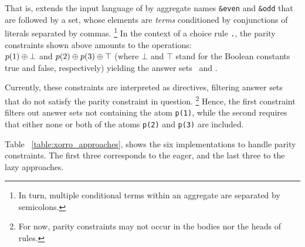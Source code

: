  
 That is, \xorro{} extends the input language of \clingo{} by
 aggregate names \texttt{\&even} and \texttt{\&odd} that are followed
 by a set, whose elements are \emph{terms} conditioned by
 conjunctions of literals separated by commas.%
 \footnote{In turn, multiple conditional terms within an aggregate are
 	separated by semicolons.}
 In the context of a choice rule \texttt{.}, the parity constraints shown above
 amounts to the \XOR{} operations: \\
 $p(1) \oplus \bot$ and $p(2) \oplus p(3) \oplus \top$
 (where $\bot$ and $\top$ stand for the Boolean constants true and false, respectively)
 yielding the answer sets~\texttt{} and \texttt{}.
 
 
 Currently, these constraints are interpreted as directives,
 filtering answer sets that do not satisfy the parity constraint in question.
 \footnote{For now, parity constraints may not occur in the bodies nor the heads of rules.}
 Hence, the first
 constraint filters out answer sets not containing the atom
 \texttt{p(1)}, while the second requires that either none or both of
 the atoms \texttt{p(2)} and \texttt{p(3)} are included.
 
 Table~ \ref{table:xorro_approaches}, shows the six implementations to handle parity constraints.
 The first three corresponds to the eager, and the last three to the lazy approaches. 
 
